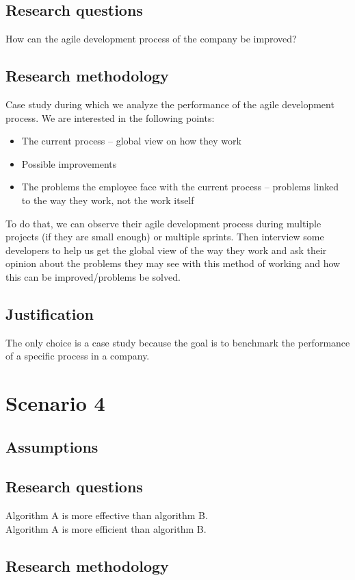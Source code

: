 \documentclass{article}
\begin{document}
\subsection{Research questions}
How can the agile development process of the company be improved?

\subsection{Research methodology}
Case study during which we analyze the performance of the agile development process. We are interested in the following points:
\begin{itemize}
    \item The current process – global view on how they work
    \item Possible improvements
    \item The problems the employee face with the current process – problems linked to the way they work, not the work itself
\end{itemize}
To do that, we can observe their agile development process during multiple projects (if they are small enough) or multiple sprints. Then interview some developers to help us get the global view of the way they work and ask their opinion about the problems they may see with this method of working and how this can be improved/problems be solved.

\subsection{Justification}
The only choice is a case study because the goal is to benchmark the performance of a specific process in a company.

\section{Scenario 4}
\subsection{Assumptions}

\subsection{Research questions}
Algorithm A is more effective than algorithm B. \\
Algorithm A is more efficient than algorithm B.
\subsection{Research methodology}
\end{document}
